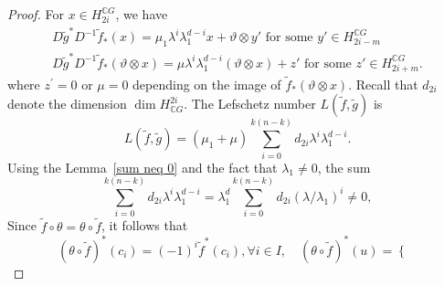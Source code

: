\documentclass{amsart}
\newcommand{\lemref}[1]{Lemma~\ref{#1}}
\begin{document}
\begin{proof}
	For $x\in H_{2i}^{\mathbb{C}G}$, we %
have 
	\begin{equation*}\label{D cal}
		\begin{split}
			D\tilde g^* D^{-1} \tilde f_*(x)=\mu_1 \lambda^i\lambda_1^{d-i} x + \vartheta\otimes y'\text{ for some }y' \in H^{\mathbb CG}_{2i-m}\\
			D\tilde g^* D^{-1} \tilde f_*(\vartheta\otimes x)= \mu \lambda^i\lambda_1^{d-i}(\vartheta\otimes x)+z' \text{ for some }z'\in H_{2i+m}^{\mathbb CG}.
		\end{split}
	\end{equation*}
	where %
$z^{'} =0$ or $\mu =0$ depending on the image of $\tilde{f}_*(\vartheta \otimes x)$.
	Recall that  %
$d_{2i}$ denote the %
dimension $\dim H^{2i}_{\mathbb CG}$. The Lefschetz number  $L(\tilde{f},\tilde g)$ is
	\begin{equation*}\label{L(f,g)}
		L(\tilde f,\tilde g) =(\mu_1 + \mu) \sum_{i=0}^{k(n-k)} d_{2i} \lambda^i\lambda_1^{d-i}.
	\end{equation*}
Using the \lemref{sum neq 0} and %
the fact that $\lambda_1\neq 0$, the %
sum
	\[
	\sum_{i=0}^{k(n-k)} d_{2i} \lambda^i\lambda_1^{d-i}=\lambda_1^d\sum_{i=0}^{k(n-k)} d_{2i} (\lambda/\lambda_1)^i\neq 0,
	\]
	Since %
$\tilde f\circ\theta=\theta\circ \tilde f$, it follows that $$(\theta\circ \tilde  f )^*(c_i)= (-1)^i \tilde{f}^*(c_i), \forall i \in I, \quad (\theta \circ\tilde  f)^*(u)=\begin{cases}

\end{cases}$$
\end{proof}
\end{document}

